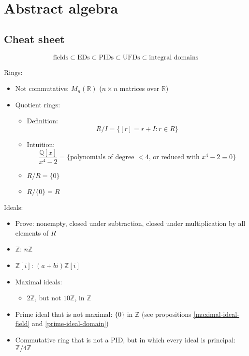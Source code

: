\chapter{Abstract algebra}

\section{Cheat sheet}

$$ \text{fields} \subset \text{EDs} \subset \text{PIDs} \subset \text{UFDs}
    \subset \text{integral domains} $$

Rings:
    \begin{itemize}
        \item Not commutative: $M_n(\mathbb{R})$ ($n \times n$ matrices over $\mathbb{R}$)
        \item Quotient rings:
            \begin{itemize}
                \item Definition:
                    $$ R/I = \{ [r] = r + I : r \in R \} $$
                \item Intuition:
                    $$ \frac{\mathbb{Q}[x]}{x^4 - 2} = \{ \text{polynomials of degree $<4$, or reduced with $x^4 - 2 \equiv 0$} \} $$
                \item $R/R = \{0\}$
                \item $R/\{0\} = R$
            \end{itemize}
    \end{itemize}

Ideals:
    \begin{itemize}
        \item Prove: nonempty, closed under subtraction, closed under multiplication by all elements of $R$
        \item $\mathbb{Z}$: $n\mathbb{Z}$
        \item $\mathbb{Z}[i]$: $(a + bi) \mathbb{Z}[i]$
        \item Maximal ideals:
            \begin{itemize}
                \item $2\mathbb{Z}$, but not $10\mathbb{Z}$, in $\mathbb{Z}$
            \end{itemize}
        \item Prime ideal that is not maximal: $\{0\}$ in $\mathbb{Z}$ (see propositions \ref{maximal-ideal-field} and \ref{prime-ideal-domain})
        \item Commutative ring that is not a PID, but in which every ideal is principal: $\mathbb{Z}/4\mathbb{Z}$
    \end{itemize}

